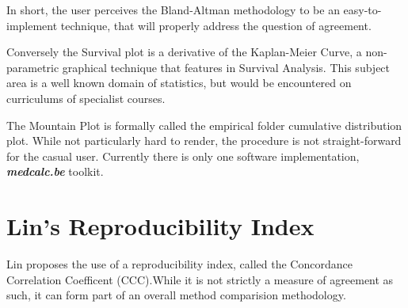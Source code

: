 \documentclass[12pt, a4paper]{report}
\theoremstyle{plain}
\theoremstyle{definition}
\theoremstyle{remark}
\begin{document}
	In short, the user perceives the Bland-Altman methodology to be an easy-to-implement technique, that will properly address the question of agreement.
	
	Conversely the Survival plot is a derivative of the Kaplan-Meier Curve, a non-parametric graphical technique that features in Survival Analysis. This subject area is a well known domain of statistics, but would be encountered 
	on curriculums of specialist courses. 
	
	The Mountain Plot is formally called the empirical folder cumulative distribution plot. While not particularly hard to render, the procedure is not straight-forward for the casual user. Currently there is only one software implementation, \textbf{\textit{medcalc.be}} toolkit.
	\section{Lin's Reproducibility Index} Lin proposes the use of a
	reproducibility index, called the Concordance Correlation
	Coefficent (CCC).While it is not strictly a measure of agreement
	as such, it can form part of an overall method comparision
	methodology.


\end{document}
